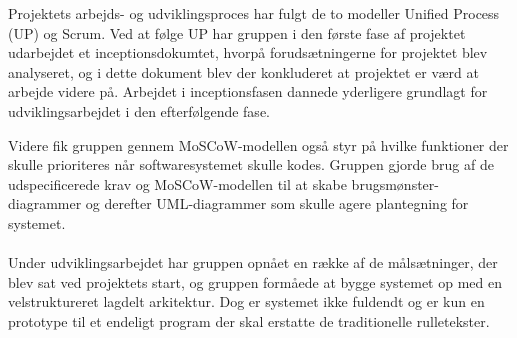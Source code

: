 Projektets arbejds- og udviklingsproces har fulgt de to modeller Unified Process (UP) og Scrum. Ved at følge UP har gruppen i den første fase af projektet udarbejdet et inceptionsdokumtet, hvorpå forudsætningerne for projektet blev analyseret, og i dette dokument blev der konkluderet at projektet er værd at arbejde videre på. Arbejdet i inceptionsfasen dannede yderligere grundlagt for udviklingsarbejdet i den efterfølgende fase.

Videre fik gruppen gennem MoSCoW-modellen også styr på hvilke funktioner der skulle prioriteres når softwaresystemet skulle kodes. Gruppen gjorde brug af de udspecificerede krav og MoSCoW-modellen til at skabe brugsmønster-diagrammer og derefter UML-diagrammer som skulle agere plantegning for systemet.
\\\\
Under udviklingsarbejdet har gruppen opnået en række af de målsætninger, der blev sat ved projektets start, og gruppen formåede at bygge systemet op med en velstruktureret lagdelt arkitektur. Dog er systemet ikke fuldendt og er kun en prototype til et endeligt program der skal erstatte de traditionelle rulletekster.
